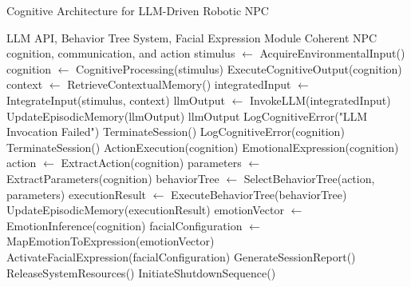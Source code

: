 \documentclass[pdflatex,sn-mathphys-num]{sn-jnl}%
\theoremstyle{thmstyleone}%
\theoremstyle{thmstyletwo}%
\theoremstyle{thmstylethree}%
\begin{document}
\begin{algorithm}
\caption{Cognitive Architecture for LLM-Driven Robotic NPC}\label{algo_cognitive_npc}
\begin{algorithmic}[1]
\Require LLM API, Behavior Tree System, Facial Expression Module
\Ensure Coherent NPC cognition, communication, and action
\State stimulus $\gets$ AcquireEnvironmentalInput()
\State cognition $\gets$ CognitiveProcessing(stimulus)
\State ExecuteCognitiveOutput(cognition)
\EndWhile
\EndProcedure
{}
\State context $\gets$ RetrieveContextualMemory()
\State integratedInput $\gets$ IntegrateInput(stimulus, context)
\State llmOutput $\gets$ InvokeLLM(integratedInput)
\State UpdateEpisodicMemory(llmOutput)
\State \Return llmOutput
\Else
\State LogCognitiveError("LLM Invocation Failed")
\State TerminateSession()
\EndIf
\EndProcedure
{}
\State LogCognitiveError(cognition)
\State TerminateSession()
\Else
\ParallelProcedure
\State ActionExecution(cognition)
\State EmotionalExpression(cognition)
\EndParallelProcedure
\EndIf
\EndProcedure
{}
\State action $\gets$ ExtractAction(cognition)
\State parameters $\gets$ ExtractParameters(cognition)
\State behaviorTree $\gets$ SelectBehaviorTree(action, parameters)
\State executionResult $\gets$ ExecuteBehaviorTree(behaviorTree)
\State UpdateEpisodicMemory(executionResult)
\EndProcedure
{}
\State emotionVector $\gets$ EmotionInference(cognition)
\State facialConfiguration $\gets$ MapEmotionToExpression(emotionVector)
\State ActivateFacialExpression(facialConfiguration)
\EndProcedure
{}
\State GenerateSessionReport()
\State ReleaseSystemResources()
\State InitiateShutdownSequence()
\EndProcedure
\end{algorithmic}
\end{algorithm}
\end{document}
